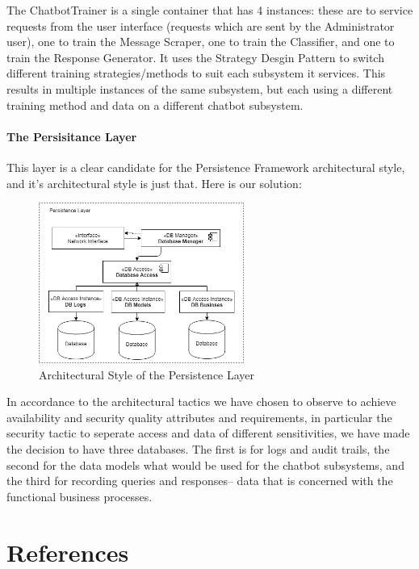\documentclass[11pt]{article}
\begin{document}
The ChatbotTrainer is a single container that has 4 instances: these are to service requests from the user interface (requests which are sent by the Administrator user), one to train the Message Scraper, one to train the Classifier, and one to train the Response Generator. It uses the Strategy Desgin Pattern to switch different training strategies/methods to suit each subsystem it services. This results in multiple instances of the same subsystem, but each using a different training method and data on a different chatbot subsystem.

\paragraph{The Persisitance Layer}
This layer is a clear candidate for the Persistence Framework architectural style, and it's architectural style is just that. Here is our solution:

\begin{figure}[H]
	\centering
	\includegraphics[width=0.6\textwidth]{../../images/Persistence_Layer_Architecture.png}
	\caption{Architectural Style of the Persistence Layer}
\end{figure}

In accordance to the architectural tactics we have chosen to observe to achieve availability and security quality attributes and requirements, in particular the security tactic to seperate access and data of different sensitivities, we have made the decision to have three databases. The first is for logs and audit trails, the second for the data models what would be used for the chatbot subsystems, and the third for recording queries and responses-- data that is concerned with the functional business processes.

\section{References}


\end{document}
